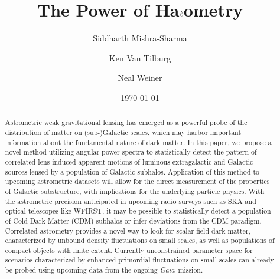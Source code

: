 \documentclass[prd,aps,10pt,nofootinbib,twocolumn,superscriptaddress,preprintnumbers,balancelastpage,longbibliography]{revtex4-1}
\newcommand{\Gaia}{\emph{Gaia}\xspace}
\begin{document}
\title{The Power of Ha$\boldmath\ell$ometry}
\author{Siddharth Mishra-Sharma}
\author{Ken Van Tilburg}
\author{Neal Weiner}

\date{\today}

\begin{abstract}
Astrometric weak gravitational lensing has emerged as a powerful probe of the distribution of matter on (sub-)Galactic scales, which may harbor important information about the fundamental nature of dark matter. In this paper, we propose a novel method utilizing angular power spectra to statistically detect the pattern of correlated lens-induced apparent motions of luminous extragalactic and Galactic sources lensed by a population of Galactic subhalos. Application of this method to upcoming astrometric datasets will allow for the direct measurement of the properties of Galactic substructure, with implications for the underlying particle physics. With the astrometric precision anticipated in upcoming radio surveys such as SKA and optical telescopes like WFIRST, it may be possible to statistically detect a population of Cold Dark Matter (CDM) subhalos or infer deviations from the CDM paradigm. Correlated astrometry provides a novel way to look for scalar field dark matter, characterized by unbound density fluctuations on small scales, as well as populations of compact objects with finite extent. Currently unconstrained parameter space for scenarios characterized by enhanced primordial fluctuations on small scales can already be probed using upcoming data from the ongoing \Gaia~mission. \href{https://github.com/smsharma/Lensing-PowerSpectra}{\faGithub}
\end{abstract}

\maketitle
\end{document}
